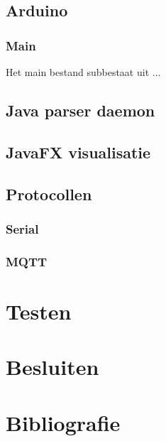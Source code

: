 \documentclass[a4paper]{report}
\begin{document}
\section{Arduino}
\subsection{Main}
Het main bestand subbestaat uit ...

\section{Java parser daemon}

\section{JavaFX visualisatie}

\section{Protocollen}
\subsection{Serial}

\subsection{MQTT}

\chapter{Testen}

\chapter{Besluiten}

\chapter{Bibliografie}
\end{document}
